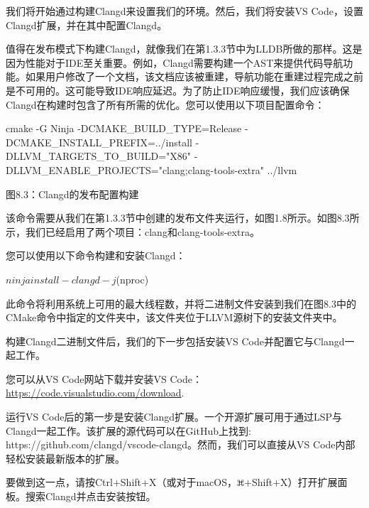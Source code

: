 我们将开始通过构建Clangd来设置我们的环境。然后，我们将安装VS Code，设置Clangd扩展，并在其中配置Clangd。


值得在发布模式下构建Clangd，就像我们在第1.3.3节中为LLDB所做的那样。这是因为性能对于IDE至关重要。例如，Clangd需要构建一个AST来提供代码导航功能。如果用户修改了一个文档，该文档应该被重建，导航功能在重建过程完成之前是不可用的。这可能导致IDE响应延迟。为了防止IDE响应缓慢，我们应该确保Clangd在构建时包含了所有所需的优化。您可以使用以下项目配置命令：

\begin{shell}
cmake -G Ninja -DCMAKE_BUILD_TYPE=Release -DCMAKE_INSTALL_PREFIX=../install -DLLVM_TARGETS_TO_BUILD="X86" -DLLVM_ENABLE_PROJECTS="clang;clang-tools-extra" ../llvm
\end{shell}

\begin{center}
图8.3：Clangd的发布配置构建
\end{center}

该命令需要从我们在第1.3.3节中创建的发布文件夹运行，如图1.8所示。如图8.3所示，我们已经启用了两个项目：clang和clang-tools-extra。

您可以使用以下命令构建和安装Clangd：

\begin{shell}
$ ninja install-clangd -j $(nproc)
\end{shell}

此命令将利用系统上可用的最大线程数，并将二进制文件安装到我们在图8.3中的CMake命令中指定的文件夹中，该文件夹位于LLVM源树下的安装文件夹中。

构建Clangd二进制文件后，我们的下一步包括安装VS Code并配置它与Clangd一起工作。


您可以从VS Code网站下载并安装VS Code： \url{https://code.visualstudio.com/download}.

运行VS Code后的第一步是安装Clangd扩展。一个开源扩展可用于通过LSP与Clangd一起工作。该扩展的源代码可以在GitHub上找到: https://github.com/clangd/vscode-clangd。然而，我们可以直接从VS Code内部轻松安装最新版本的扩展。

要做到这一点，请按Ctrl+Shift+X（或对于macOS，\includegraphics[width=0.02\textwidth]{content/part2/chapter8/images/3.png}+Shift+X）打开扩展面板。搜索Clangd并点击安装按钮。

